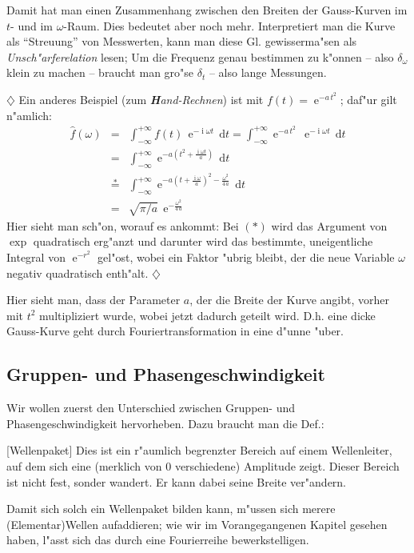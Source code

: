 \documentclass[twoside,a4paper]{book}
\newcommand{\st}[1]{{\slshape \textbf #1}}
\newcommand{\diff}{\ensuremath{\, \mathrm{d}}}
\newcommand{\E}{\ensuremath{\operatorname{e}}}
\newcommand{\I}{\ensuremath{\operatorname{i}}}
\newenvironment{Def}[1][]{%
\definecolor{shadethmcolor}{rgb}{.95,.95,.95}%
\definecolor{shaderulecolor}{rgb}{0.8,0.8,0.8}%
\setlength{\shadeboxrule}{1pt}%
\begin{Defi}[#1]%
 }{\end{Defi}}
\newenvironment*{Beispiel}[0]{$\diamondsuit$\sffamily}{ \hfill $\diamondsuit$}
\begin{document}
   Damit hat man einen Zusammenhang zwischen den Breiten der
   Gauss-Kurven im $t$- und im $\omega$-Raum. Dies bedeutet aber noch
   mehr. Interpretiert man die Kurve als "`Streuung"' von Messwerten,
   kann man diese Gl. gewisserma"sen als
   \emph{Unsch"arferelation} lesen; Um die
   Frequenz genau bestimmen zu k"onnen -- also $\delta_\omega$ klein
   zu machen -- braucht man gro"se $\delta_t$ -- also lange Messungen.


\begin{Beispiel}
Ein anderes Beispiel (zum \st{Hand-Rechnen}) ist mit $f(t) = \E^{-a \, t^2}$;
daf"ur gilt n"amlich:
\begin{eqnarray*}
   \hat f(\omega) &=& \int_{- \infty}^{+ \infty} f(t) \, \E^{-\I
     \omega t} \diff t 
= 
\int_{- \infty}^{+ \infty} \E^{-a \, t^2} \, \E^{-\I
     \omega t} \diff t\\
&=&
\int_{- \infty}^{+ \infty} \E^{-a (t^2 +\frac{\I \omega t}{a})} \diff
t\\
&\stackrel{\ast}{=}&
\int_{- \infty}^{+ \infty} \E^{-a (t + \frac{\I \omega}{a})^2 -
  \frac{\omega^2}{4 \, a}} \diff t\\
&=&
\sqrt{\pi / a} \, \E^{ - \frac{\omega^2}{4 \, a}}
\end{eqnarray*}
Hier sieht man sch"on, worauf es ankommt: Bei $(\ast)$ wird das
Argument von $\exp$ quadratisch erg"anzt und darunter wird das
bestimmte, uneigentliche Integral von $\E^{-r^2}$ gel"ost, wobei ein
Faktor "ubrig bleibt, der die neue Variable $\omega$ negativ
quadratisch enth"alt.
\end{Beispiel}

Hier sieht man, dass der Parameter $a$, der die Breite der Kurve
angibt, vorher mit $t^2$ multipliziert wurde, wobei jetzt dadurch
geteilt wird. D.h. eine dicke Gauss-Kurve geht durch
Fouriertransformation in eine d"unne "uber.




\subsection{Gruppen- und Phasengeschwindigkeit}
\label{kap_gruppen-und-phasengeschwindigkeit}



Wir wollen zuerst den Unterschied zwischen Gruppen- und
Phasengeschwindigkeit hervorheben. Dazu braucht man die Def.:
\begin{Def}
   [Wellenpaket]
   Dies ist ein r"aumlich begrenzter Bereich auf einem Wellenleiter,
   auf dem sich eine (merklich von $0$ verschiedene) Amplitude
   zeigt. Dieser Bereich ist nicht fest, sonder wandert. Er kann dabei
   seine Breite ver"andern.
\end{Def}
Damit sich solch ein Wellenpaket bilden kann, m"ussen sich merere
(Elementar)Wellen aufaddieren; wie wir im Vorangegangenen Kapitel
gesehen haben, l"asst sich das durch eine Fourierreihe
bewerkstelligen.
\end{document}
